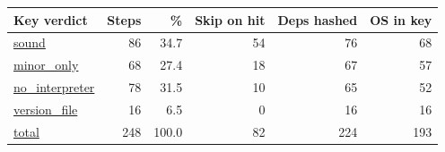 \begin{tabular}{lrrrrr}
\toprule
Key verdict & Steps & \% & Skip on hit & Deps hashed & OS in key \\
\midrule
\href{https://github.com/mark124/cache-key-soundness/blob/v1.0/results/table2_key_composition.csv\#L2}{sound} & 86 & 34.7 & 54 & 76 & 68 \\
\href{https://github.com/mark124/cache-key-soundness/blob/v1.0/results/table2_key_composition.csv\#L3}{minor\_only} & 68 & 27.4 & 18 & 67 & 57 \\
\href{https://github.com/mark124/cache-key-soundness/blob/v1.0/results/table2_key_composition.csv\#L4}{no\_interpreter} & 78 & 31.5 & 10 & 65 & 52 \\
\href{https://github.com/mark124/cache-key-soundness/blob/v1.0/results/table2_key_composition.csv\#L5}{version\_file} & 16 & 6.5 & 0 & 16 & 16 \\
\href{https://github.com/mark124/cache-key-soundness/blob/v1.0/results/table2_key_composition.csv\#L6}{total} & 248 & 100.0 & 82 & 224 & 193 \\
\bottomrule
\end{tabular}
